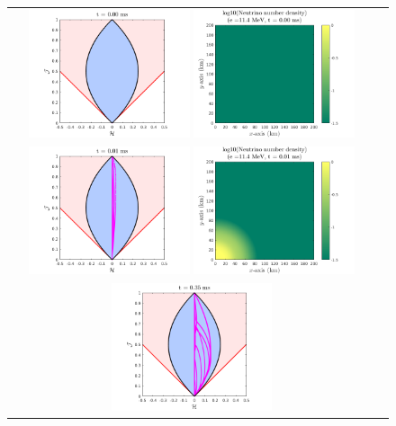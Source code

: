 \begin{figure}[h]
  \centering
  \begin{tabular}{cc}
    \includegraphics[width=0.45\textwidth]{figures/NSS_0_1}
    \includegraphics[width=0.45\textwidth]{figures/NSS_0_2} \\
    \includegraphics[width=0.45\textwidth]{figures/NSS_1_1}
    \includegraphics[width=0.45\textwidth]{figures/NSS_1_2} \\
    \includegraphics[width=0.45\textwidth]{figures/NSS_3_1}

\end{tabular}
\end{figure}
